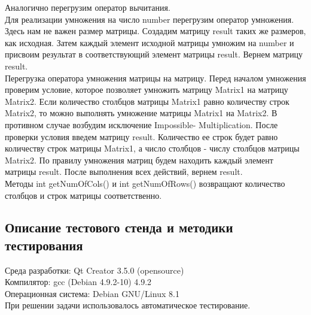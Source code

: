 \documentclass[12pt,a4paper]{report}
\begin{document}
Аналогично перегрузим оператор вычитания. \\
Для реализации умножения на число number перегрузим оператор умножения. Здесь нам не важен размер матрицы. Создадим матрицу result таких же размеров, как исходная. Затем каждый элемент исходной матрицы умножим на number и присвоим результат в соответствующий элемент матрицы result. Вернем матрицу result. \\
Перегрузка оператора умножения матрицы на матрицу. Перед началом умножения проверим условие, которое позволяет умножить матрицу Matrix1 на матрицу Matrix2. Если количество столбцов матрицы Matrix1 равно количеству строк Matrix2, то можно выполнять умножение матрицы Matrix1 на Matrix2. В противном случае возбудим исключение Impossible- Multiplication. После проверки условия введем матрицу result. Количество ее строк будет равно количеству строк матрицы Matrix1, а число столбцов - числу столбцов матрицы Matrix2. По правилу умножения матриц будем находить каждый элемент матрицы result. После выполнения всех действий, вернем result. \\
Методы int getNumOfCols() и int getNumOfRows() возвращают количество столбцов и строк матрицы соответственно. 
\subsection{Описание тестового стенда и методики тестирования}
Среда разработки: Qt Creator 3.5.0 (opensource)\\
Компилятор: gcc (Debian 4.9.2-10) 4.9.2 \\
Операционная система: Debian GNU/Linux 8.1 \\
При решении задачи использовалось автоматическое тестирование. 
\end{document}
